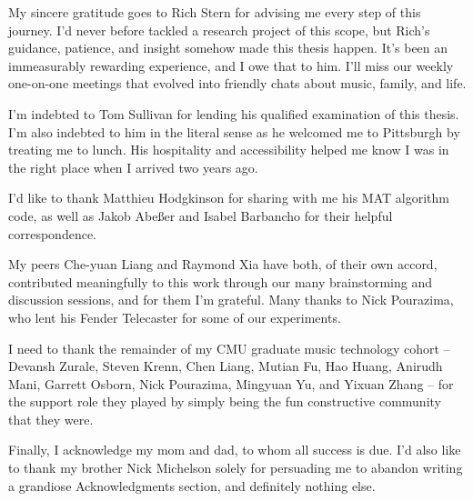 \documentclass[12pt]{cmuthesis}
\begin{document}
\begin{acknowledgments}
My sincere gratitude goes to Rich Stern for advising me every step of this journey. I'd never before tackled a research project of this scope, but Rich's guidance, patience, and insight somehow made this thesis happen. It's been an immeasurably rewarding experience, and I owe that to him. I'll miss our weekly one-on-one meetings that evolved into friendly chats about music, family, and life.

I'm indebted to Tom Sullivan for lending his qualified examination of this thesis. I'm also indebted to him in the literal sense as he welcomed me to Pittsburgh by treating me to lunch. His hospitality and accessibility helped me know I was in the right place when I arrived two years ago.

I'd like to thank Matthieu Hodgkinson for sharing with me his MAT algorithm code, as well as Jakob Abe{\ss}er and Isabel Barbancho for their helpful correspondence. 

My peers Che-yuan Liang and Raymond Xia have both, of their own accord, contributed meaningfully to this work through our many brainstorming and discussion sessions, and for them I'm grateful. Many thanks to Nick Pourazima, who lent his Fender Telecaster for some of our experiments.

I need to thank the remainder of my CMU graduate music technology cohort -- Devansh Zurale, Steven Krenn, Chen Liang, Mutian Fu, Hao Huang, Anirudh Mani, Garrett Osborn, Nick Pourazima, Mingyuan Yu, and Yixuan Zhang -- for the support role they played by simply being the fun constructive community that they were.

Finally, I acknowledge my mom and dad, to whom all success is due. I'd also like to thank my brother Nick Michelson solely for persuading me to abandon writing a grandiose Acknowledgments section, and definitely nothing else.

\end{acknowledgments}



\tableofcontents
\listoffigures
\listoftables

\mainmatter


%
%
%
%
%
\doublespacing
\noindent
\end{document}
